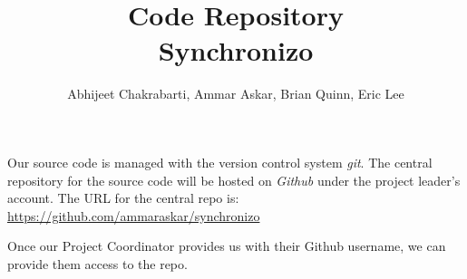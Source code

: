 \documentclass{article}
\title{\textbf{Code Repository}\\ 
Synchronizo \\}
\author{Abhijeet Chakrabarti, Ammar Askar, Brian Quinn, Eric Lee}
\begin{document}
\maketitle

Our source code is managed with the version control system \textit{git}. The central repository for the source code will be hosted on \textit{Github} under the project leader's account. The URL for the central repo is: \url{https://github.com/ammaraskar/synchronizo}

Once our Project Coordinator provides us with their Github username, we can provide them access to the repo.
\end{document}
